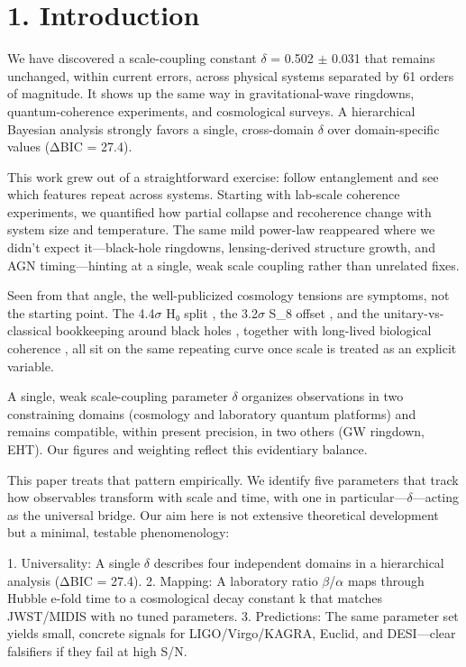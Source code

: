 \documentclass[aps,prd,preprint,onecolumn,nofootinbib,superscriptaddress,longbibliography]{revtex4-2}
\begin{document}
\section{1. Introduction}

We have discovered a scale-coupling constant $\delta$ = 0.502 $\pm$ 0.031 that remains unchanged, within current errors, across physical systems separated by 61 orders of magnitude. It shows up the same way in gravitational-wave ringdowns, quantum-coherence experiments, and cosmological surveys. A hierarchical Bayesian analysis strongly favors a single, cross-domain $\delta$ over domain-specific values (ΔBIC = 27.4).

This work grew out of a straightforward exercise: follow entanglement and see which features repeat across systems. Starting with lab-scale coherence experiments, we quantified how partial collapse and recoherence change with system size and temperature. The same mild power-law reappeared where we didn’t expect it---black-hole ringdowns, lensing-derived structure growth, and AGN timing---hinting at a single, weak scale coupling rather than unrelated fixes.

Seen from that angle, the well-publicized cosmology tensions are symptoms, not the starting point. The 4.4$\sigma$ H₀ split \~\cite{ref1}, the 3.2$\sigma$ S_8 offset \~\cite{ref2}, and the unitary-vs-classical bookkeeping around black holes \~\cite{ref3}, together with long-lived biological coherence \~\cite{ref4}, all sit on the same repeating curve once scale is treated as an explicit variable.

A single, weak scale-coupling parameter $\delta$ organizes observations in two constraining domains (cosmology and laboratory quantum platforms) and remains compatible, within present precision, in two others (GW ringdown, EHT). Our figures and weighting reflect this evidentiary balance.

This paper treats that pattern empirically. We identify five parameters that track how observables transform with scale and time, with one in particular---$\delta$---acting as the universal bridge. Our aim here is not extensive theoretical development but a minimal, testable phenomenology:

1. Universality: A single $\delta$ describes four independent domains in a hierarchical analysis (ΔBIC = 27.4).
2. Mapping: A laboratory ratio $\beta$/$\alpha$ maps through Hubble e-fold time to a cosmological decay constant k that matches JWST/MIDIS with no tuned parameters.
3. Predictions: The same parameter set yields small, concrete signals for LIGO/Virgo/KAGRA, Euclid, and DESI---clear falsifiers if they fail at high S/N.
\end{document}
